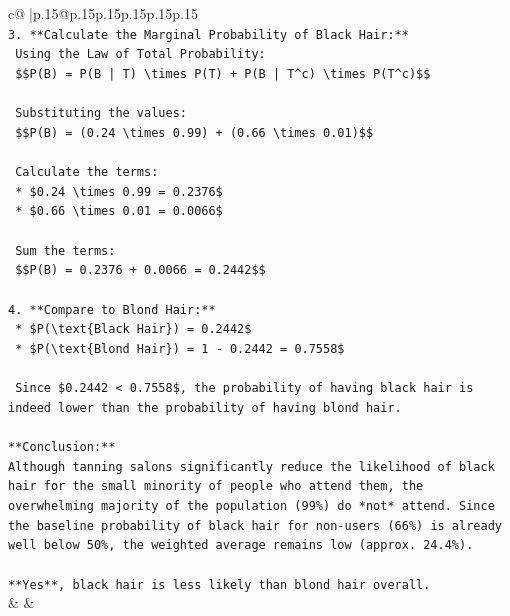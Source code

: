 \documentclass{article}
\begin{document}
{\begin{supertabular}{c@{$\;$}|p{.15\linewidth}@{}p{.15\linewidth}p{.15\linewidth}p{.15\linewidth}p{.15\linewidth}p{.15\linewidth}}
{{{\\ 
\texttt{3.  **Calculate the Marginal Probability of Black Hair:**} \\
\texttt{    Using the Law of Total Probability:} \\
\texttt{    \$\$P(B) = P(B | T) \textbackslash{}times P(T) + P(B | T\^{}c) \textbackslash{}times P(T\^{}c)\$\$} \\
\\ 
\texttt{    Substituting the values:} \\
\texttt{    \$\$P(B) = (0.24 \textbackslash{}times 0.99) + (0.66 \textbackslash{}times 0.01)\$\$} \\
\\ 
\texttt{    Calculate the terms:} \\
\texttt{    *   \$0.24 \textbackslash{}times 0.99 = 0.2376\$} \\
\texttt{    *   \$0.66 \textbackslash{}times 0.01 = 0.0066\$} \\
\\ 
\texttt{    Sum the terms:} \\
\texttt{    \$\$P(B) = 0.2376 + 0.0066 = 0.2442\$\$} \\
\\ 
\texttt{4.  **Compare to Blond Hair:**} \\
\texttt{    *   \$P(\textbackslash{}text\{Black Hair\}) = 0.2442\$} \\
\texttt{    *   \$P(\textbackslash{}text\{Blond Hair\}) = 1 {-} 0.2442 = 0.7558\$} \\
\\ 
\texttt{    Since \$0.2442 < 0.7558\$, the probability of having black hair is indeed lower than the probability of having blond hair.} \\
\\ 
\texttt{**Conclusion:**} \\
\texttt{Although tanning salons significantly reduce the likelihood of black hair for the small minority of people who attend them, the overwhelming majority of the population (99\%) do *not* attend. Since the baseline probability of black hair for non{-}users (66\%) is already well below 50\%, the weighted average remains low (approx. 24.4\%).} \\
\\ 
\texttt{**Yes**, black hair is less likely than blond hair overall.} \\
            }
        }
    }
    & & \\ \\


\end{supertabular}}
\end{document}
